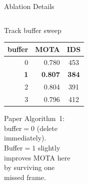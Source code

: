 \documentclass[aspectratio=169, 10pt]{beamer}
\newcommand{\best}[1]{\textbf{\textcolor{green!50!black}{#1}}}
\begin{document}
\begin{frame}{Ablation Details}
\begin{columns}[T]
    \begin{block}{Track buffer sweep}
      \vspace{0.3em}
      \small
      \begin{tabular}{rrc}
        \toprule
        buffer & MOTA & IDS \\
        \midrule
        0 & 0.780 & 453 \\
        \best{1} & \best{0.807} & \best{384} \\
        2 & 0.804 & 391 \\
        3 & 0.796 & 412 \\
        \bottomrule
      \end{tabular}
      \vspace{0.3em}

      Paper Algorithm~1:\\
      buffer$=0$ (delete\\
      immediately).\\
      Buffer$=1$ slightly\\
      improves MOTA here\\
      by surviving one\\
      missed frame.
    \end{block}

  \end{columns}

\end{frame}
\end{document}
